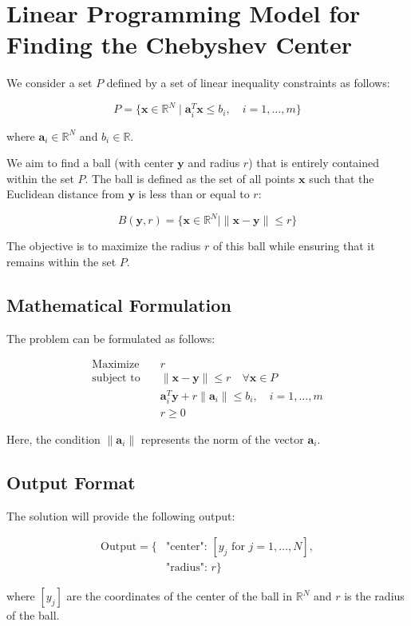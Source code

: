 \documentclass{article}
\begin{document}
\section*{Linear Programming Model for Finding the Chebyshev Center}

We consider a set \( P \) defined by a set of linear inequality constraints as follows:

\[
P = \{ \mathbf{x} \in \mathbb{R}^N \mid \mathbf{a}_i^T \mathbf{x} \leq b_i, \quad i = 1, \ldots, m \}
\]

where \( \mathbf{a}_i \in \mathbb{R}^N \) and \( b_i \in \mathbb{R} \).

We aim to find a ball (with center \( \mathbf{y} \) and radius \( r \)) that is entirely contained within the set \( P \). The ball is defined as the set of all points \( \mathbf{x} \) such that the Euclidean distance from \( \mathbf{y} \) is less than or equal to \( r \):

\[
B(\mathbf{y}, r) = \{ \mathbf{x} \in \mathbb{R}^N \mid \|\mathbf{x} - \mathbf{y}\| \leq r \}
\]

The objective is to maximize the radius \( r \) of this ball while ensuring that it remains within the set \( P \).

\subsection*{Mathematical Formulation}

The problem can be formulated as follows:

\[
\begin{align*}
\text{Maximize} & \quad r \\
\text{subject to} & \quad \|\mathbf{x} - \mathbf{y}\| \leq r \quad \forall \mathbf{x} \in P \\
& \quad \mathbf{a}_i^T \mathbf{y} + r \|\mathbf{a}_i\| \leq b_i, \quad i = 1, \ldots, m \\
& \quad r \geq 0
\end{align*}
\]

Here, the condition \( \|\mathbf{a}_i\| \) represents the norm of the vector \( \mathbf{a}_i \).

\subsection*{Output Format}

The solution will provide the following output:

\[
\begin{align*}
\text{Output} = \{ & \text{"center": } [y_j \text{ for } j = 1, \ldots, N], \\
                  & \text{"radius": } r \}
\end{align*}
\]

where \( [y_j] \) are the coordinates of the center of the ball in \( \mathbb{R}^N \) and \( r \) is the radius of the ball.
\end{document}
